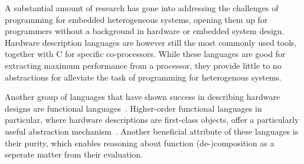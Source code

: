 \documentclass[../main.tex]{subfiles}
\begin{document}


A substantial amount of research has gone into addressing the challenges of programming for embedded heterogeneous systems, opening them up for programmers without a background in hardware or embedded system design. Hardware description languages are however still the most commonly used tools, together with C for specific co-processors. While these languages are good for extracting maximum performance from a processor, they provide little to no abstractions for alleviate the task of programming for heterogenous systems.




Another group of languages that have shown success in describing hardware designs are functional languages~\cite{sheeran2005}. Higher-order functional languages in particular, where hardware descriptions are first-class objects, offer a particularly useful abstraction mechanism~\cite{baaij2010, bjesse1998, gill2010}. Another beneficial attribute of these languages is their purity, which enables reasoning about function (de-)composition as a seperate matter from their evaluation.

\end{document}
